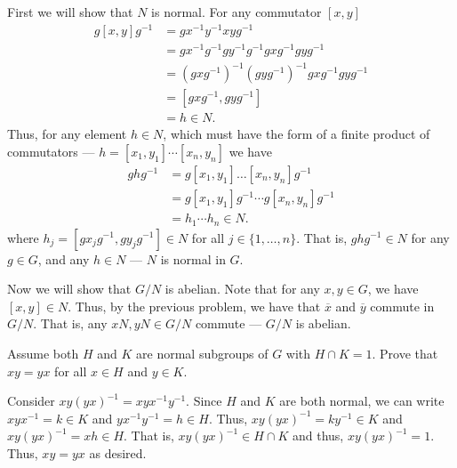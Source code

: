 \documentclass[12 pt, letterpaper]{hmcpset}
\begin{document}
\begin{solution}
	First we will show that $N$ is normal. For any commutator $[x, y]$
	\[
		\begin{split}
			g [x, y] g^{-1} & = g x^{-1} y^{-1} x y g^{-1} \\
					& = g x^{-1} g^{-1} g y^{-1} g^{-1} g x g^{-1} g y g^{-1} \\
					& = (g x g^{-1})^{-1} (g y g^{-1})^{-1} g x g^{-1} g y g^{-1} \\
					& = [g x g^{-1}, g y g^{-1}] \\
					& = h \in N.
		\end{split}
	\]
	Thus, for any element $h \in N$, which must have the form of a finite product of commutators --- $h = [x_{1}, y_{1}] \cdots [x_{n}, y_{n}]$ we have \[
		\begin{split}
			ghg^{-1} & = g [x_{1}, y_{1}] \dots [x_{n}, y_{n}] g^{-1} \\
				 & = g [x_{1}, y_{1}] g^{-1} \cdots g [x_{n}, y_{n}] g^{-1} \\
				 & = h_{1} \cdots h_{n} \in N.
		\end{split}
	\]
	where $h_{j} = [g x_{j} g^{-1}, g y_{j} g^{-1}] \in N$ for all $j \in \{ 1, \dots, n \}$. That is, $ghg^{-1} \in N$ for any $g \in G$, and any $h \in N$ --- $N$ is normal in $G$. 

	Now we will show that $G/N$ is abelian. Note that for any $x, y \in G$, we have $[x, y] \in N$. Thus, by the previous problem, we have that $\overline{x}$ and $\overline{y}$ commute in $G/N$. That is, any $xN, yN \in G/N$ commute --- $G/N$ is abelian.
\end{solution}

\pagebreak

\begin{problem}
	Assume both $H$ and $K$ are normal subgroups of $G$ with $H \cap K = 1$. Prove that $xy = yx$ for all $x \in H$ and $y \in K$.
\end{problem}

\begin{solution}
	Consider $xy(yx)^{-1} = xy x^{-1} y^{-1}$. Since $H$ and $K$ are both normal, we can write $x y x^{-1} = k \in K$ and $y x^{-1} y^{-1} = h \in H$. Thus, $xy(yx)^{-1} = k y^{-1} \in K$ and $xy(yx)^{-1} = x h \in H$. That is, $xy(yx)^{-1} \in H \cap K$ and thus, $xy(yx)^{-1} = 1$. Thus, $xy = yx$ as desired.
\end{solution}

\pagebreak
\end{document}

